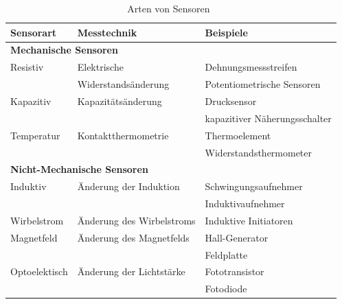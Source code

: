	        \begin{table}[h]
	        \begin{tabularx}{\textwidth}{l|l|l}
	
	                    \textbf{Sensorart} & \textbf{Messtechnik} & \textbf{Beispiele}\\
	                    \hline
	                    \multicolumn{3}{l}{\textbf{Mechanische Sensoren}}\\
	                    \hline
	                    Resistiv & Elektrische & Dehnungsmessstreifen \\
	                    &Widerstandsänderung& Potentiometrische Sensoren\\
	                    \hline
	                    
	                    Kapazitiv & Kapazitätsänderung & Drucksensor\\
	                    && kapazitiver Näherungsschalter \\
	                    \hline
	                    
	                    Temperatur & Kontaktthermometrie & Thermoelement\\
	                    && Widerstandsthermometer \\
	                    \hline
	                    
	                    \multicolumn{3}{l}{\textbf{Nicht-Mechanische Sensoren}}\\
	                    \hline
	                    
	                    Induktiv & Änderung der Induktion & Schwingungsaufnehmer \\
	                    && Induktivaufnehmer\\
	                    \hline
	                    
	                    Wirbelstrom & Änderung des Wirbelstroms & Induktive Initiatoren\\
	                    \hline
	                    
	                    Magnetfeld & Änderung des Magnetfelds & Hall-Generator\\
	                    && Feldplatte\\
	                    \hline
	                    
	                    Optoelektisch & Änderung der Lichtstärke & Fototransistor\\
	                    && Fotodiode\\
	                    
	
	                \end{tabularx}\\
	                \caption{Arten von Sensoren~\cite{TS_sensor_aufteilen}}
	                \label{fig:TS09}
	            \end{table}
	         	

